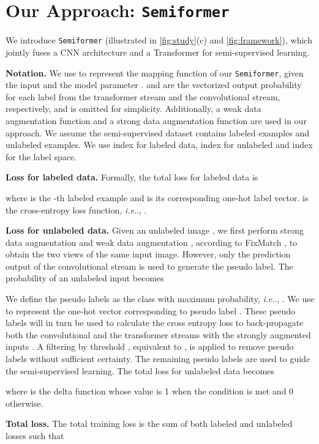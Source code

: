 \documentclass[runningheads]{llncs}
\makeatletter
\DeclareRobustCommand\onedot{\futurelet\@let@token\@onedot}
\def\@onedot{\ifx\@let@token.\else.\null\fi\xspace}
\def\ie{\emph{i.e}\onedot} \def\Ie{\emph{I.e}\onedot}
\newcommand{\fakeparagraph}[1]{\textbf{#1}}
\newcommand*{\system}{\texttt{Semiformer}\@\xspace}
\makeatother
\begin{document}
\section{Our Approach: \system}

We introduce {\system} (illustrated in \cref{fig:study}(c) and \cref{fig:framework}), which jointly fuses a CNN architecture and a Transformer for semi-supervised learning.

\fakeparagraph{Notation.} We use  to represent the mapping function of our \system, given the input  and the model parameter .  and  are the vectorized output probability for each label from the transformer stream and the convolutional stream, respectively, and  is omitted for simplicity.  Additionally, a weak data augmentation function  and a strong data augmentation function  are used in our approach. We assume the semi-supervised dataset contains  labeled examples and  unlabeled examples. We use index  for labeled data, index  for unlabeled and index  for the label space. 

\fakeparagraph{Loss for labeled data.} Formally, the total loss for labeled data is

where  is the -th labeled example and  is its corresponding one-hot label vector.  is the cross-entropy loss function, \ie, .

\fakeparagraph{Loss for unlabeled data.} Given an unlabeled image , we first perform strong data augmentation  and weak data augmentation , according to FixMatch \cite{sohn2020fixmatch}, to obtain the two views of the same input image. However, only the prediction output of the convolutional stream  is used to generate the pseudo label.
The probability  of an unlabeled input  becomes

We define the pseudo labels as the class with maximum probability, \ie, . We use  to represent the one-hot vector corresponding to pseudo label . These pseudo labels will in turn be used to calculate the cross entropy loss to back-propagate both the convolutional and the transformer streams with the strongly augmented inputs .  A filtering by threshold , equivalent to , is applied to remove pseudo labels without sufficient certainty. The remaining pseudo labels are used to guide the semi-supervised learning. 
The total loss for unlabeled data becomes

where  is the delta function whose value is 1 when the condition is met and 0 otherwise. 

\fakeparagraph{Total loss.} The total training loss is the sum of both labeled and unlabeled losses such that
\end{document}
